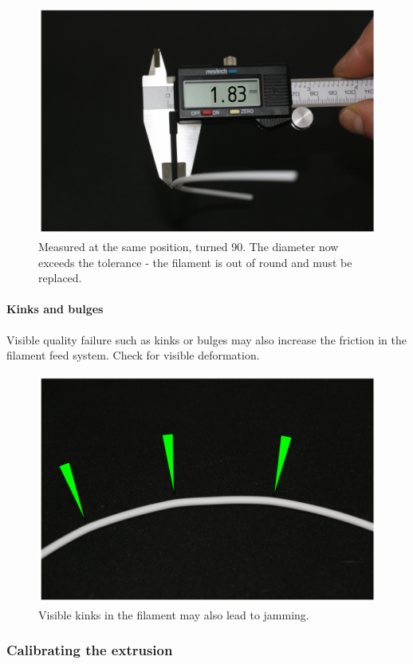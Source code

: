 \begin{figure}[H]
  \centering
  \includegraphics[width=.7\linewidth]{./img/filametmeasureround_2.png}
  \caption{Measured at the same position, turned 90\degree . The diameter now exceeds the 
           tolerance - the filament is out of round and must be replaced.}
\end{figure}


\paragraph{Kinks and bulges}

Visible quality failure such as kinks or bulges may also increase the friction in the filament feed system. Check for visible deformation. 

\begin{figure}[H]
  \centering
  \includegraphics[width=.7\linewidth]{./img/filametmeasurekinks_1.png}
  \caption{Visible kinks in the filament may also lead to jamming.}
\end{figure}


\subsubsection{Calibrating the extrusion}

